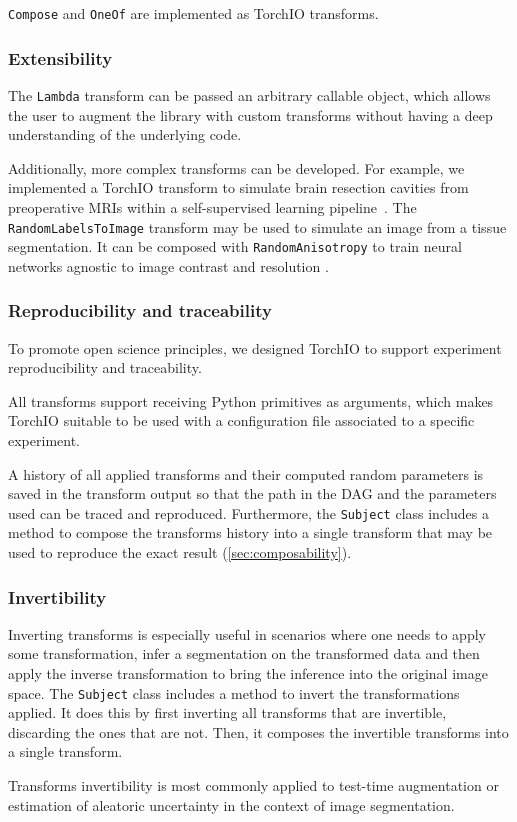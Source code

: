 \texttt{Compose} and \texttt{OneOf} are implemented as TorchIO
transforms.


\subsubsection{Extensibility}

The \texttt{Lambda} transform can be passed an arbitrary callable object, which allows the user to augment the library with custom transforms without having a deep understanding of the underlying code.

Additionally, more complex transforms can be developed.
For example, we implemented a TorchIO transform to simulate brain resection cavities from preoperative \acp{MRI} within a self-supervised learning pipeline~\cite{perez-garcia_simulation_2020}.
The \texttt{RandomLabelsToImage} transform may be used to simulate an image from a tissue segmentation.
It can be composed with \texttt{RandomAnisotropy} to train neural networks agnostic to image contrast and resolution \cite{billot_learning_2020,billot_partial_2020,iglesias_joint_2020}.


\subsubsection{Reproducibility and traceability}

To promote open science principles, we designed TorchIO to support experiment reproducibility and traceability.

All transforms support receiving Python primitives as arguments, which makes TorchIO suitable to be used with a configuration file associated to a specific experiment.

A history of all applied transforms and their computed random parameters is saved in the transform output so that the path in the \ac{DAG} and the parameters used can be traced and reproduced.
Furthermore, the \texttt{Subject} class includes a method to compose the transforms history into a single transform that may be used to reproduce the exact result (\cref{sec:composability}).


\subsubsection{Invertibility}

Inverting transforms is especially useful in scenarios where one needs to apply some transformation, infer a segmentation on the transformed data and then apply the inverse transformation to bring the inference into the original image space.
The \texttt{Subject} class includes a method to invert the transformations applied.
It does this by first inverting all transforms that are invertible, discarding the ones that are not.
Then, it composes the invertible transforms into a single transform.

Transforms invertibility is most commonly applied to test-time augmentation \cite{moshkov_test-time_2020} or estimation of aleatoric uncertainty \cite{wang_aleatoric_2019} in the context of image segmentation.
